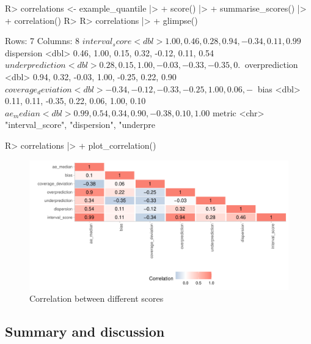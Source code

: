 \documentclass[
]{jss}
\begin{document}
\begin{CodeChunk}
\begin{CodeInput}
R> correlations <- example_quantile |>
+   score() |>
+   summarise_scores() |>
+   correlation()
R>
R> correlations |>
+   glimpse()
\end{CodeInput}
\begin{CodeOutput}
Rows: 7
Columns: 8
$ interval_score     <dbl> 1.00, 0.46, 0.28, 0.94, -0.34, 0.11, 0.99
$ dispersion         <dbl> 0.46, 1.00, 0.15, 0.32, -0.12, 0.11, 0.54
$ underprediction    <dbl> 0.28, 0.15, 1.00, -0.03, -0.33, -0.35, 0.~
$ overprediction     <dbl> 0.94, 0.32, -0.03, 1.00, -0.25, 0.22, 0.90
$ coverage_deviation <dbl> -0.34, -0.12, -0.33, -0.25, 1.00, 0.06, -~
$ bias               <dbl> 0.11, 0.11, -0.35, 0.22, 0.06, 1.00, 0.10
$ ae_median          <dbl> 0.99, 0.54, 0.34, 0.90, -0.38, 0.10, 1.00
$ metric             <chr> "interval_score", "dispersion", "underpre~
\end{CodeOutput}
\begin{CodeInput}
R> correlations |>
+   plot_correlation()
\end{CodeInput}
\begin{figure}[!h]

{\centering \includegraphics[width=1\linewidth]{manuscript_files/figure-latex/correlation-plot-1}

}

\caption[Correlation between different scores]{Correlation between different scores}\label{fig:correlation-plot}
\end{figure}
\end{CodeChunk}

\hypertarget{summary-and-discussion}{%
\subsection{Summary and discussion}\label{summary-and-discussion}}
\end{document}
